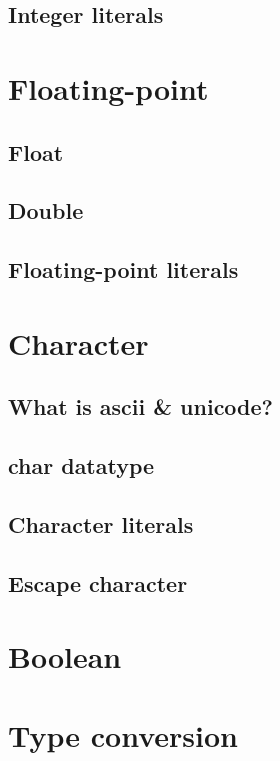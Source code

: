 \documentclass[14pt,fleqn]{extbook} %
\begin{document}
\subsection{Integer literals}

\section{Floating-point}

\subsection{Float}

\subsection{Double}

\subsection{Floating-point literals}

\section{Character}

\subsection{What is ascii \& unicode?}

\subsection{char datatype}

\subsection{Character literals}

\subsection{Escape character}

\section{Boolean}

\section{Type conversion}

\end{document}
